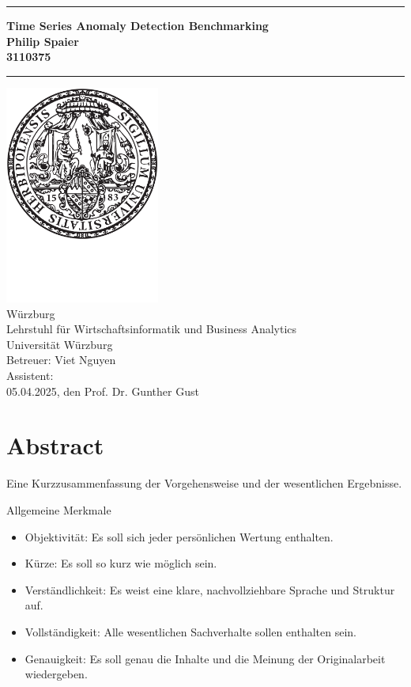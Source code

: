 \documentclass[12pt,oneside]{article}
\newcommand{\JMUTitle}[9]{

  \thispagestyle{empty}
  \vspace*{\stretch{1}}
  {\parindent0cm
  \rule{\linewidth}{.7ex}
  }
  \begin{flushright}
    \sffamily\bfseries\Huge
    #1\\
    \vspace*{\stretch{1}}
    \sffamily\bfseries\large
    #2\\
    \vspace*{\stretch{1}}
    \sffamily\bfseries\small
    #3
  \end{flushright}
  \rule{\linewidth}{.7ex}

  \vspace*{\stretch{1}}
  \begin{center}
    \includegraphics[width=2in]{siegel} \\
    \vspace*{\stretch{1}}
    \Large #5 \\

    \vspace*{\stretch{2}}
   \large Lehrstuhl f\"{u}r Wirtschaftsinformatik und Business Analytics\\
    \large Universität Würzburg\\
    \vspace*{\stretch{1}}
    \large Betreuer:  #8 \\[1mm]
    \large Assistent:  #9 \\[1mm]
    \vspace*{\stretch{1}}
    \large #6, den #7
  \end{center}
}
\begin{document}
  \JMUTitle
      {Time Series Anomaly Detection Benchmarking}        %
      {Philip Spaier}                        %
      {3110375}
      
      {Seminararbeit } %
      {Würzburg}                           %
      {05.04.2025}                          %
      {Prof. Dr. Gunther Gust}           %
      {Viet Nguyen} %
      
  \clearpage

\lhead{}
    \setcounter{page}{1}

\tableofcontents
\clearpage

\listoffigures

\listoftables
\clearpage

\setlength{\parskip}{0.5em} 


\section*{Abstract}

Eine Kurzzusammenfassung der Vorgehensweise und der wesentlichen Ergebnisse.

Allgemeine Merkmale
\begin{itemize}
    \item Objektivität: Es soll sich jeder persönlichen Wertung enthalten.
    \item Kürze: Es soll so kurz wie möglich sein.
    \item Verständlichkeit: Es weist eine klare, nachvollziehbare Sprache und Struktur auf.
    \item Vollständigkeit: Alle wesentlichen Sachverhalte sollen enthalten sein.
    \item Genauigkeit: Es soll genau die Inhalte und die Meinung der Originalarbeit wiedergeben.
\end{itemize}{}


\clearpage
{}  
    \setcounter{page}{1}
\lhead{\nouppercase{\leftmark}}

\end{document}
